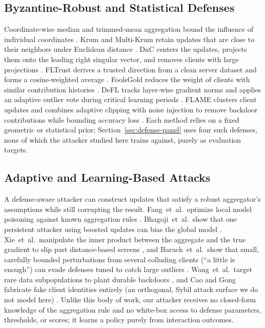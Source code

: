 \documentclass[conference,9pt]{IEEEtran}
\begin{document}
\subsection{Byzantine-Robust and Statistical Defenses}
Coordinate-wise median and trimmed-mean aggregation bound the influence of individual coordinates \cite{byzantine}. Krum and Multi-Krum retain updates that are close to their neighbors under Euclidean distance \cite{krum}. DnC centers the updates, projects them onto the leading right singular vector, and removes clients with large projections \cite{dnc}. FLTrust derives a trusted direction from a clean server dataset and forms a cosine-weighted average \cite{fltrust}. FoolsGold reduces the weight of clients with similar contribution histories \cite{foolsgold}. DeFL tracks layer-wise gradient norms and applies an adaptive outlier vote during critical learning periods \cite{defl}. FLAME clusters client updates and combines adaptive clipping with noise injection to remove backdoor contributions while bounding accuracy loss \cite{nguyen2022flame}. Each method relies on a fixed geometric or statistical prior; Section~\ref{sec:defense-panel} uses four such defenses, none of which the attacker studied here trains against, purely as evaluation targets.

\subsection{Adaptive and Learning-Based Attacks}
A defense-aware attacker can construct updates that satisfy a robust aggregator's assumptions while still corrupting the result. Fang~et~al.\ optimize local model poisoning against known aggregation rules \cite{fang2020}. Bhagoji~et~al.\ show that one persistent attacker using boosted updates can bias the global model \cite{bhagoji2019}. Xie~et~al.\ manipulate the inner product between the aggregate and the true gradient to slip past distance-based screens \cite{xie2020fallofempires}, and Baruch~et~al.\ show that small, carefully bounded perturbations from several colluding clients (``a little is enough'') can evade defenses tuned to catch large outliers \cite{baruch2019little}. Wang~et~al.\ target rare data subpopulations to plant durable backdoors \cite{wang2020attackoftails}, and Cao and Gong fabricate fake client identities entirely (an orthogonal, Sybil attack surface we do not model here) \cite{cao2022mpaf}. Unlike this body of work, our attacker receives no closed-form knowledge of the aggregation rule and no white-box access to defense parameters, thresholds, or scores; it learns a policy purely from interaction outcomes.
\end{document}
